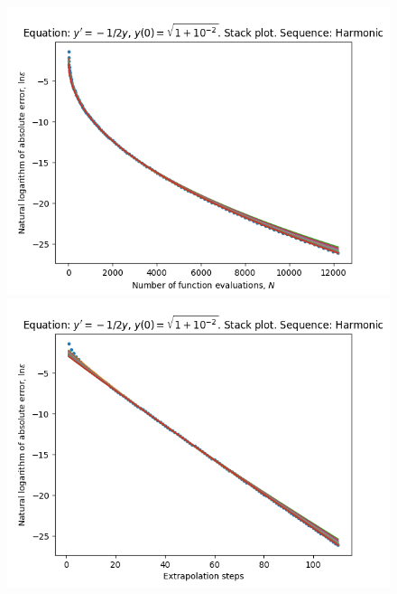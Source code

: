 \begin{figure}[H]
\centering
\begin{minipage}{0.45\textwidth}
\centering
\includegraphics[scale=0.45]{../results/emr_plots/quad_sing_2_hp_harmonic_stack.png}
\end{minipage}
\begin{minipage}{0.45\textwidth}
\centering
\includegraphics[scale=0.45]{../results/emr_plots/quad_sing_2_hp_harmonic_steps_stack.png}
\end{minipage}
\end{figure}

